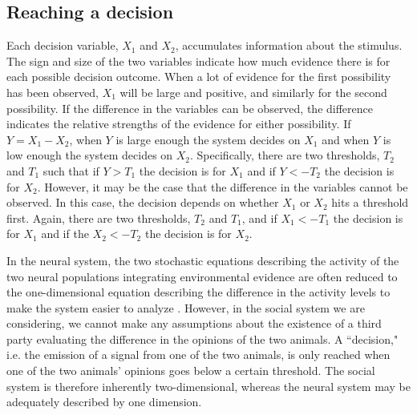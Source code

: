 \documentclass{article}
\begin{document}
\subsection{Reaching a decision }
Each decision variable, $X_1$ and $X_2$, accumulates information about the stimulus.  The sign and size of the two variables indicate how much evidence there is for each possible decision outcome.  When a lot of evidence for the first possibility has been observed, $X_1$ will be large and positive, and similarly for the second possibility.  If the difference in the variables can be observed, the difference indicates the relative strengths of the evidence for either possibility. If $Y=X_1-X_2$, when $Y$ is large enough the system decides on $X_1$ and when $Y$ is low enough the system decides on $X_2$.  Specifically, there are two thresholds, $T_2$ and $T_1$ such that if $Y>T_1$ the decision is for $X_1$ and if $Y<-T_2$ the decision is for $X_2$.  However, it may be the case that the difference in the variables cannot be observed.  In this case, the decision depends on whether $X_1$ or $X_2$ hits a threshold first.  Again, there are two thresholds, $T_2$ and $T_1$, and if $X_1<-T_1$ the decision is for $X_1$ and if the $X_2<-T_2$ the decision is for $X_2$. 

In the neural system, the two stochastic equations describing the activity of the two neural populations integrating environmental evidence are often reduced to the one-dimensional equation describing the difference in the activity levels to make the system easier to analyze \cite{Brown:2005fk,Bogacz:2006uq,Feng:2009kl}.  However, in the social system we are considering, we cannot make any assumptions about the existence of a third party evaluating the difference in the opinions of the two animals.  A ``decision," i.e. the emission of a signal from one of the two animals, is only reached when one of the two animals' opinions goes below a certain threshold.  The social system is therefore inherently two-dimensional, whereas the neural system may be adequately described by one dimension.   
\end{document}
